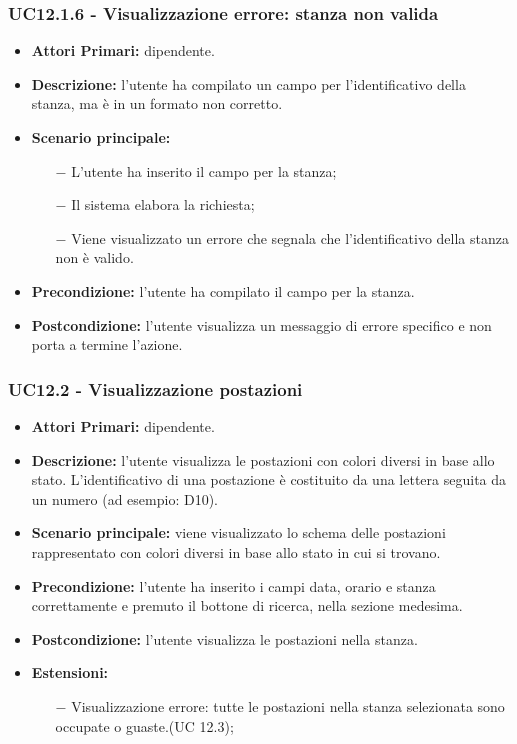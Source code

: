 \subsubsection{ UC12.1.6 - Visualizzazione errore: stanza non valida }
\begin{itemize}
	\item\textbf{Attori Primari:} dipendente.
\item\textbf{Descrizione:} l’utente ha compilato un campo per l'identificativo della stanza, ma è in un formato non corretto.
\item\textbf{Scenario principale:} 
\begin{itemize}
	\item[$-$] L’utente ha inserito il campo per la stanza;
	\item[$-$] Il sistema elabora la richiesta;
	\item[$-$] Viene visualizzato un errore che segnala che l'identificativo della stanza non è valido.
\end{itemize}
\item\textbf{Precondizione:} l’utente ha compilato il campo per la stanza.
\item\textbf{Postcondizione:} l’utente visualizza un messaggio di errore specifico e non porta a termine l’azione.
\end{itemize}
\subsubsection{ UC12.2 - Visualizzazione postazioni  }
\begin{itemize}
	\item\textbf{Attori Primari:} dipendente.
	\item\textbf{Descrizione:} l’utente visualizza le postazioni con colori diversi in base allo stato. L'identificativo di una postazione è costituito da una lettera seguita da un numero (ad esempio: D10). 
	\item\textbf{Scenario principale:} viene visualizzato lo schema delle postazioni rappresentato con colori diversi in base allo stato in cui si trovano.
	\item\textbf{Precondizione:} l’utente ha inserito i campi data, orario e stanza correttamente e premuto il bottone di ricerca, nella sezione 
	medesima.
	\item\textbf{Postcondizione:} l’utente visualizza le postazioni nella stanza.
	\item\textbf{Estensioni:}
	\begin{itemize}
		\item[$-$] Visualizzazione errore: tutte le postazioni nella stanza selezionata sono occupate o guaste.(UC 12.3);
	\end{itemize}
\end{itemize}
